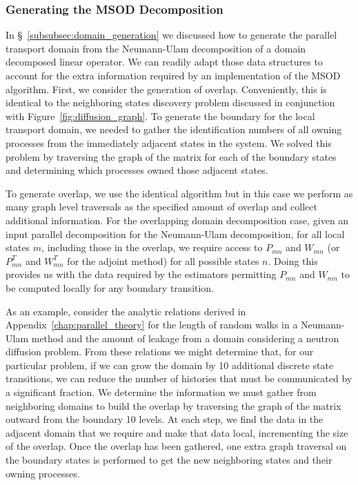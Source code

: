 \documentclass[letterpaper,11pt]{article}
\begin{document}
\subsubsection{Generating the MSOD Decomposition}
\label{subsubsec:msod_generation}
In \S~\ref{subsubsec:domain_generation} we discussed how to generate the
parallel transport domain from the Neumann-Ulam decomposition of a
domain decomposed linear operator. We can readily adapt those data
structures to account for the extra information required by an
implementation of the MSOD algorithm. First, we consider the
generation of overlap. Conveniently, this is identical to the
neighboring states discovery problem discussed in conjunction with
Figure~\ref{fig:diffusion_graph}. To generate the boundary for the
local transport domain, we needed to gather the identification numbers
of all owning processes from the immediately adjacent states in the
system. We solved this problem by traversing the graph of the matrix
for each of the boundary states and determining which processes owned
those adjacent states.

To generate overlap, we use the identical algorithm but in this case
we perform as many graph level traversals as the specified amount of
overlap and collect additional information. For the overlapping domain
decomposition case, given an input parallel decomposition for the
Neumann-Ulam decomposition, for all local states $m$, including those
in the overlap, we require access to $P_{mn}$ and $W_{mn}$ (or
$P^T_{mn}$ and $W^T_{mn}$ for the adjoint method) for all possible
states $n$. Doing this provides us with the data required by the
estimators permitting $P_{mn}$ and $W_{mn}$ to be computed locally for
any boundary transition.

As an example, consider the analytic relations derived in
Appendix~\ref{chap:parallel_theory} for the length of random walks in
a Neumann-Ulam method and the amount of leakage from a domain
considering a neutron diffusion problem. From these relations we might
determine that, for our particular problem, if we can grow the domain
by 10 additional discrete state transitions, we can reduce the number
of histories that must be communicated by a significant fraction. We
determine the information we must gather from neighboring domains to
build the overlap by traversing the graph of the matrix outward from
the boundary 10 levels. At each step, we find the data in the adjacent
domain that we require and make that data local, incrementing the size
of the overlap. Once the overlap has been gathered, one extra graph
traversal on the boundary states is performed to get the new
neighboring states and their owning processes.
\end{document}
